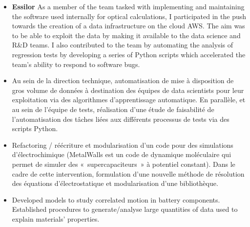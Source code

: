 \documentclass[10pt,a4paper,ragged2e,academicons]{altacv}
\begin{document}
\divider

\begin{itemize}
\item \textbf{Essilor} As a member of the team tasked with implementing and maintaining the software used internally for optical calculations, I participated in the push towards the creation of a data infrastructure on the cloud AWS. The aim was to be able to exploit the data by making it available to the data science and R\&D teams. I also contributed to the team by automating the analysis of regression tests by developing a series of Python scripts which accelerated the team's ability to respond to software bugs.
\item Au sein de la direction technique, automatisation de mise à disposition de gros volume de
données à destination des équipes de data scientists pour leur exploitation via des
algorithmes d’apprentissage automatique.
En parallèle, et au sein de l’équipe de tests, réalisation d’une étude de faisabilité de
l’automatisation des tâches liées aux différents processus de tests via des scripts Python. 
\end{itemize}

\divider

\begin{itemize}
\item Refactoring / réécriture et modularisation d’un code pour des simulations
d’électrochimique (MetalWalls est un code de dynamique moléculaire qui permet de
simuler des « supercapaciteurs » à potentiel constant).
Dans le cadre de cette intervention, formulation d’une nouvelle méthode de résolution
des équations d’électrostatique et modularisation d'une bibliothèque. 
\end{itemize}

\clearpage
{}

\begin{itemize}
\item Developed models to study correlated motion in
battery components.
Established procedures to generate/analyse large
quantities of data used to explain materials'
properties. 
\end{itemize}

\divider
\end{document}
